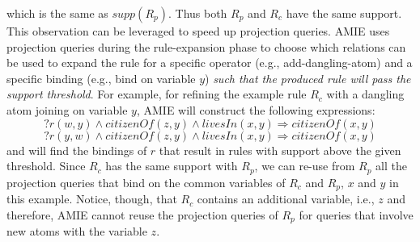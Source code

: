 \noindent which is the same as $supp(R_p)$. Thus both $R_p$ and $R_c$ have the same support.
This observation can be leveraged to speed up projection queries.
AMIE uses projection queries during the rule-expansion phase to choose which relations can be used to expand the rule for 
a specific operator (e.g., add-dangling-atom) and a specific binding (e.g., bind on variable $y$) \emph{such that the produced rule
will pass the support threshold}.
For example, for refining the example rule $R_c$ with a dangling atom joining on variable $y$, AMIE will construct the following expressions:
\[
?r(w,y) \wedge \textit{citizenOf}(z,y)\wedge \textit{livesIn}(x,y)\Rightarrow \textit{citizenOf}(x,y)
\]
\[
?r(y,w) \wedge \textit{citizenOf}(z,y)\wedge \textit{livesIn}(x,y)\Rightarrow \textit{citizenOf}(x,y)
\]
\noindent and  will find the bindings of $r$ that result in rules with support above the given threshold.
Since $R_c$ has the same support with $R_p$, we can re-use from $R_p$ all the projection queries  that bind on the 
common variables of $R_c$ and $R_p$, $x$ and $y$ in this example. Notice, though, that $R_c$
contains an additional variable, i.e., $z$ and therefore, AMIE cannot reuse the projection queries
of $R_p$ for queries that involve new atoms with the variable $z$.




